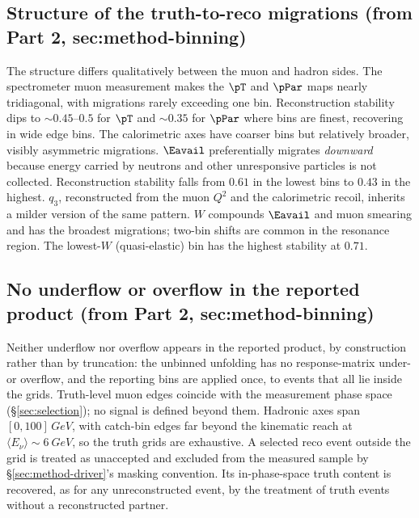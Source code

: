 \subsection{Structure of the truth-to-reco migrations (from Part 2, sec:method-binning)}
The structure differs qualitatively between the muon and hadron sides. The spectrometer muon measurement makes the $\pT$ and $\pPar$ maps nearly tridiagonal, with migrations rarely exceeding one bin. Reconstruction stability dips to ${\sim}0.45$--$0.5$ for $\pT$ and ${\sim}0.35$ for $\pPar$ where bins are finest, recovering in wide edge bins. The calorimetric axes have coarser bins but relatively broader, visibly asymmetric migrations. $\Eavail$ preferentially migrates \emph{downward} because energy carried by neutrons and other unresponsive particles is not collected. Reconstruction stability falls from $0.61$ in the lowest bins to $0.43$ in the highest. $q_{3}$, reconstructed from the muon $Q^{2}$ and the calorimetric recoil, inherits a milder version of the same pattern. $W$ compounds $\Eavail$ and muon smearing and has the broadest migrations; two-bin shifts are common in the resonance region. The lowest-$W$ (quasi-elastic) bin has the highest stability at $0.71$.

\subsection{No underflow or overflow in the reported product (from Part 2, sec:method-binning)}
Neither underflow nor overflow appears in the reported product, by construction rather than by truncation: the unbinned unfolding has no response-matrix under- or overflow, and the reporting bins are applied once, to events that all lie inside the grids. Truth-level muon edges coincide with the measurement phase space (\S\ref{sec:selection}); no signal is defined beyond them. Hadronic axes span $[0,100]\,\si{GeV}$, with catch-bin edges far beyond the kinematic reach at $\langle E_\nu\rangle\sim\SI{6}{GeV}$, so the truth grids are exhaustive. A selected reco event outside the grid is treated as unaccepted and excluded from the measured sample by \S\ref{sec:method-driver}'s masking convention. Its in-phase-space truth content is recovered, as for any unreconstructed event, by the treatment of truth events without a reconstructed partner.

